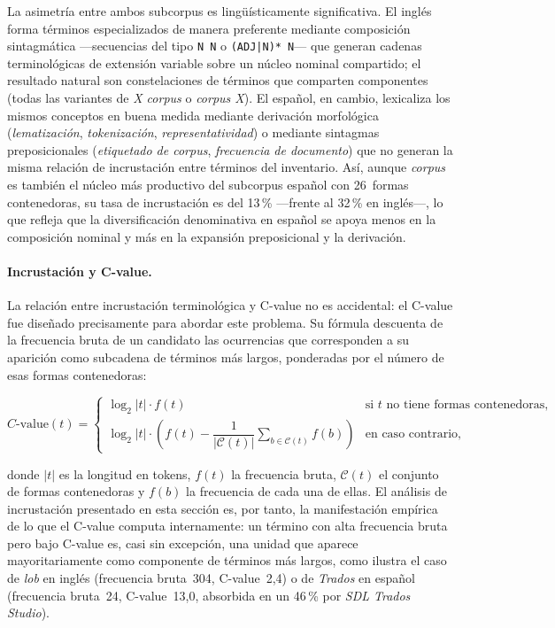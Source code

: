 La asimetría entre ambos subcorpus es lingüísticamente significativa. El inglés forma términos especializados de manera preferente mediante composición sintagmática ---secuencias del tipo \texttt{N\,N} o \texttt{(ADJ|N)*\,N}--- que generan cadenas terminológicas de extensión variable sobre un núcleo nominal compartido; el resultado natural son constelaciones de términos que comparten componentes (todas las variantes de \textit{X corpus} o \textit{corpus X}). El español, en cambio, lexicaliza los mismos conceptos en buena medida mediante derivación morfológica (\textit{lematización}, \textit{tokenización}, \textit{representatividad}) o mediante sintagmas preposicionales (\textit{etiquetado de corpus}, \textit{frecuencia de documento}) que no generan la misma relación de incrustación entre términos del inventario. Así, aunque \textit{corpus} es también el núcleo más productivo del subcorpus español con 26~formas contenedoras, su tasa de incrustación es del 13\,\% ---frente al 32\,\% en inglés---, lo que refleja que la diversificación denominativa en español se apoya menos en la composición nominal y más en la expansión preposicional y la derivación.

\paragraph{Incrustación y C-value.}
La relación entre incrustación terminológica y C-value no es accidental: el C-value \autocite{frantzi1999c} fue diseñado precisamente para abordar este problema. Su fórmula descuenta de la frecuencia bruta de un candidato las ocurrencias que corresponden a su aparición como subcadena de términos más largos, ponderadas por el número de esas formas contenedoras:

\begin{equation}
C\text{-value}(t) =
\begin{cases}
\log_2 |t| \cdot f(t) & \text{si } t \text{ no tiene formas contenedoras,} \\[4pt]
\log_2 |t| \cdot \left( f(t) - \dfrac{1}{|\mathcal{C}(t)|}\displaystyle\sum_{b \in \mathcal{C}(t)} f(b) \right) & \text{en caso contrario,}
\end{cases}
\label{eq:cvalue_incrustacion}
\end{equation}

donde $|t|$ es la longitud en tokens, $f(t)$ la frecuencia bruta, $\mathcal{C}(t)$ el conjunto de formas contenedoras y $f(b)$ la frecuencia de cada una de ellas. El análisis de incrustación presentado en esta sección es, por tanto, la manifestación empírica de lo que el C-value computa internamente: un término con alta frecuencia bruta pero bajo C-value es, casi sin excepción, una unidad que aparece mayoritariamente como componente de términos más largos, como ilustra el caso de \textit{lob} en inglés (frecuencia bruta~304, C-value~2{,}4) o de \textit{Trados} en español (frecuencia bruta~24, C-value~13{,}0, absorbida en un 46\,\% por \textit{SDL Trados Studio}).

